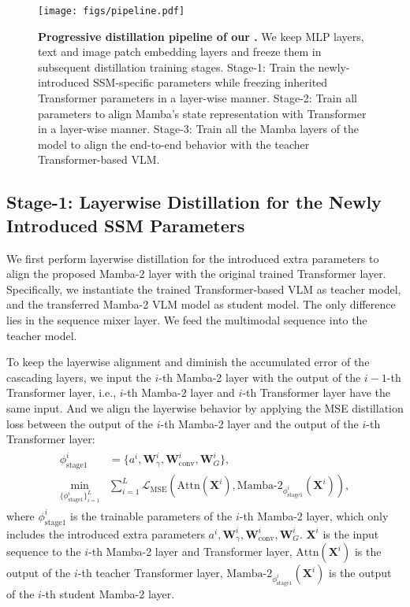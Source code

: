 \begin{figure*}[t]
    \centering
    \texttt{[image: figs/pipeline.pdf]}
    \caption{\textbf{Progressive distillation pipeline of our \name{}.} We keep MLP layers, text and image patch embedding layers and freeze them in subsequent distillation training stages. Stage-1: Train the newly-introduced SSM-specific parameters while freezing inherited Transformer parameters in a layer-wise manner. Stage-2: Train all parameters to align Mamba's state representation with Transformer in a layer-wise manner. Stage-3: Train all the Mamba layers of the model to align the end-to-end behavior with the teacher Transformer-based VLM.
    }
    \label{fig:distill_pipeline}
\end{figure*}

\subsection{Stage-1: Layerwise Distillation for the Newly Introduced SSM Parameters}
\label{sec:stage1}

We first perform layerwise distillation for the introduced extra parameters to align the proposed Mamba-2 layer with the original trained Transformer layer.
Specifically, we instantiate the trained Transformer-based VLM as teacher model, and the transferred Mamba-2 VLM model as student model.
The only difference lies in the sequence mixer layer. We feed the multimodal sequence into the teacher model.

To keep the layerwise alignment and diminish the accumulated error of the cascading layers, we input the $i$-th Mamba-2 layer with the output of the $i-1$-th Transformer layer, i.e., $i$-th Mamba-2 layer and $i$-th Transformer layer have the same input. And we align the layerwise behavior by applying the MSE distillation loss between the output of the $i$-th Mamba-2 layer and the output of the $i$-th Transformer layer:
\begin{align}
    \begin{split}
    \phi_{\text{stage1}}^i &= \{a^i, \boldsymbol{W}_{\gamma}^i, \boldsymbol{W}_{\text{conv}}^i, \boldsymbol{W}_{G}^i\}, \\
    \min_{\{\phi_{\text{stage1}}^i\}_{i=1}^{L}} &\sum_{i=1}^{L}\mathcal{L}_{\mathrm{MSE}}(\text{Attn}(\mathbf{X}^{i}), \text{Mamba-2}_{\phi_{\text{stage1}}^i}(\mathbf{X}^{i})),
\end{split}
\end{align}
where $\phi_{\text{stage1}}^i$ is the trainable parameters of the $i$-th Mamba-2 layer, which only includes the introduced extra parameters $a^i, \boldsymbol{W}_{\gamma}^i, \boldsymbol{W}_{\text{conv}}^i, \boldsymbol{W}_{G}^i$.
$\mathbf{X}^{i}$ is the input sequence to the $i$-th Mamba-2 layer and Transformer layer, $\text{Attn}(\mathbf{X}^{i})$ is the output of the $i$-th teacher Transformer layer, $\text{Mamba-2}_{\phi_{\text{stage1}}^i}(\mathbf{X}^{i})$ is the output of the $i$-th student Mamba-2 layer.




